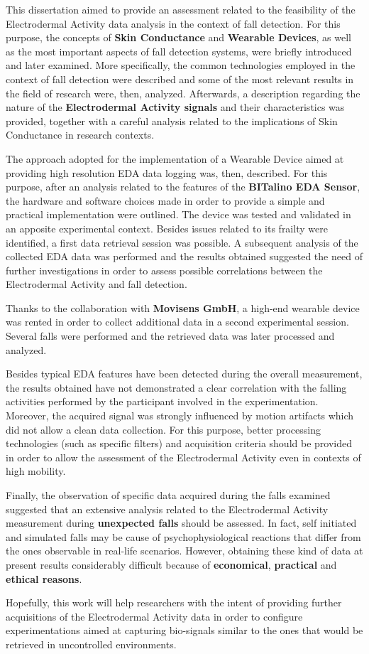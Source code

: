 \label{ch:conclusions}

This dissertation aimed to provide an assessment related to the feasibility of the Electrodermal Activity data analysis in the context of fall detection. For this purpose, the concepts of \textbf{Skin Conductance} and \textbf{Wearable Devices}, as well as the most important aspects of fall detection systems, were briefly introduced and later examined. More specifically, the common technologies employed in the context of fall detection were described and some of the most relevant results in the field of research were, then, analyzed. Afterwards, a description regarding the nature of the \textbf{Electrodermal Activity signals} and their characteristics was provided, together with a careful analysis related to the implications of Skin Conductance in research contexts.

The approach adopted for the implementation of a Wearable Device aimed at providing high resolution EDA data logging was, then, described. For this purpose, after an analysis related to the features of the \textbf{BITalino EDA Sensor}, the hardware and software choices made in order to provide a simple and practical implementation were outlined. The device was tested and validated in an apposite experimental context. Besides issues related to its frailty were identified, a first data retrieval session was possible. A subsequent analysis of the collected EDA data was performed and the results obtained suggested the need of further investigations in order to assess possible correlations between the Electrodermal Activity and fall detection.

Thanks to the collaboration with \textbf{Movisens GmbH}, a high-end wearable device was rented in order to collect additional data in a second experimental session. Several falls were performed and the retrieved data was later processed and analyzed.

Besides typical EDA features have been detected during the overall measurement, the results obtained have not demonstrated a clear correlation with the falling activities performed by the participant involved in the experimentation. Moreover, the acquired signal was strongly influenced by motion artifacts which did not allow a clean data collection. For this purpose, better processing technologies (such as specific filters) and acquisition criteria should be provided in order to allow the assessment of the Electrodermal Activity even in contexts of high mobility.

Finally, the observation of specific data acquired during the falls examined suggested that an extensive analysis related to the Electrodermal Activity measurement during \textbf{unexpected falls} should be assessed. In fact, self initiated and simulated falls may be cause of psychophysiological reactions that differ from the ones observable in real-life scenarios. However, obtaining these kind of data at present results considerably difficult because of \textbf{economical}, \textbf{practical} and \textbf{ethical reasons}.

Hopefully, this work will help researchers with the intent of providing further acquisitions of the Electrodermal Activity data in order to configure experimentations aimed at capturing bio-signals similar to the ones that would be retrieved in uncontrolled environments.


